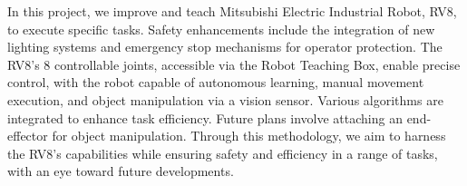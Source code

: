 In this project, we improve and teach Mitsubishi Electric Industrial Robot, RV8, to execute specific tasks. Safety enhancements include the integration of new lighting systems and emergency stop mechanisms for operator protection. The RV8's 8 controllable joints, accessible via the Robot Teaching Box, enable precise control, with the robot capable of autonomous learning, manual movement execution, and object manipulation via a vision sensor. Various algorithms are integrated to enhance task efficiency. Future plans involve attaching an end-effector for object manipulation. Through this methodology, we aim to harness the RV8's capabilities while ensuring safety and efficiency in a range of tasks, with an eye toward future developments.